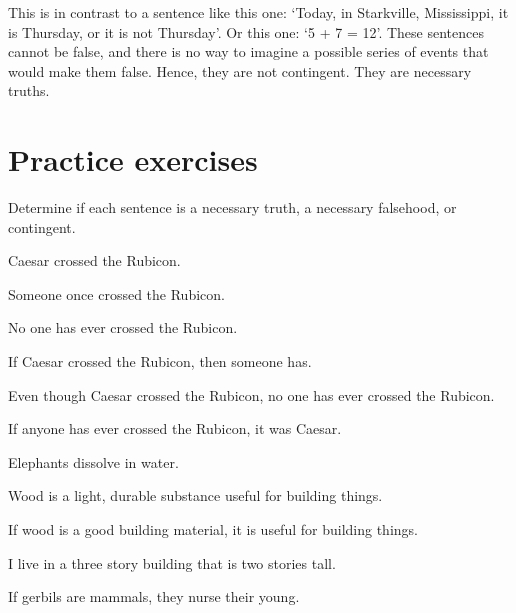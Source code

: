 This is in contrast to a sentence like this one: `Today, in Starkville, Mississippi, it is Thursday, or it is not Thursday'. Or this one: `5 + 7 = 12'. These sentences cannot be false, and there is no way to imagine a possible series of events that would make them false. Hence, they are not contingent. They are necessary truths.    



\section{Practice exercises}
\setcounter{ProbPart}{0}

\problempart
\label{pr.EnglishTautology2}
Determine if each sentence is a necessary truth, a necessary falsehood, or contingent.
\begin{earg}
\item Caesar crossed the Rubicon.
\item Someone once crossed the Rubicon.
\item No one has ever crossed the Rubicon.
\item If Caesar crossed the Rubicon, then someone has.
\item Even though Caesar crossed the Rubicon, no one has ever crossed the Rubicon.
\item If anyone has ever crossed the Rubicon, it was Caesar.

\item Elephants dissolve in water.
\item Wood is a light, durable substance useful for building things.
\item If wood is a good building material, it is useful for building things.
\item I live in a three story building that is two stories tall.
\item If gerbils are mammals, they nurse their young.
\end{earg}

